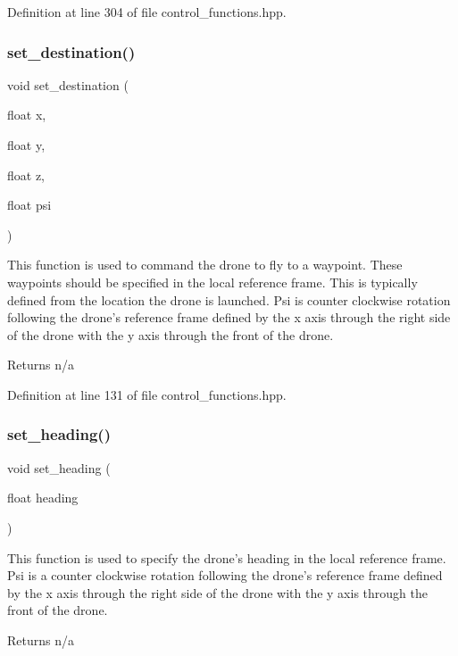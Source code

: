 Definition at line 304 of file control\+\_\+functions.\+hpp.

\mbox{\label{group__control__functions_gab90a45d8b081ba329b9d0f886adbc2d5}} 
\subsubsection{\texorpdfstring{set\_destination()}{set\_destination()}}
{\footnotesize\ttfamily void set\+\_\+destination (\begin{DoxyParamCaption}\item[{float}]{x,  }\item[{float}]{y,  }\item[{float}]{z,  }\item[{float}]{psi }\end{DoxyParamCaption})}

This function is used to command the drone to fly to a waypoint. These waypoints should be specified in the local reference frame. This is typically defined from the location the drone is launched. Psi is counter clockwise rotation following the drone’s reference frame defined by the x axis through the right side of the drone with the y axis through the front of the drone. \begin{DoxyReturn}{Returns}
n/a 
\end{DoxyReturn}


Definition at line 131 of file control\+\_\+functions.\+hpp.

\mbox{\label{group__control__functions_ga92292bc0da7dd2a58edf8e9aa10eb682}} 
\subsubsection{\texorpdfstring{set\_heading()}{set\_heading()}}
{\footnotesize\ttfamily void set\+\_\+heading (\begin{DoxyParamCaption}\item[{float}]{heading }\end{DoxyParamCaption})}

This function is used to specify the drone’s heading in the local reference frame. Psi is a counter clockwise rotation following the drone’s reference frame defined by the x axis through the right side of the drone with the y axis through the front of the drone. \begin{DoxyReturn}{Returns}
n/a 
\end{DoxyReturn}


